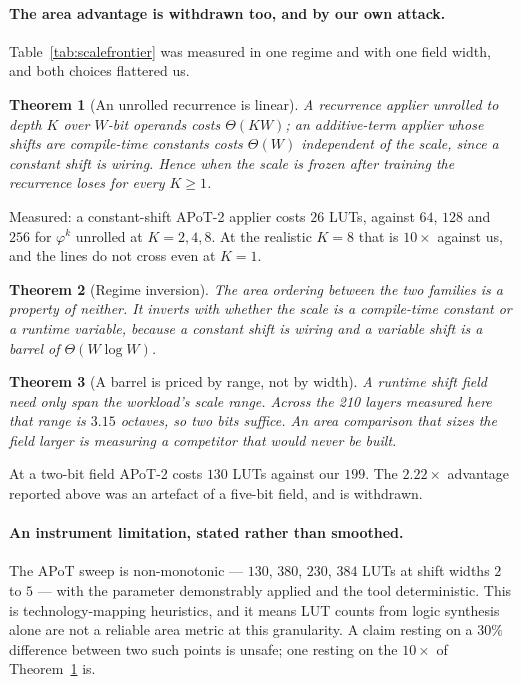 \documentclass[11pt]{article}
\newtheorem{theorem}{Theorem}
\theoremstyle{definition}
\begin{document}
\paragraph{The area advantage is withdrawn too, and by our own attack.}
Table~\ref{tab:scalefrontier} was measured in one regime and with one field
width, and both choices flattered us.

\begin{theorem}[An unrolled recurrence is linear]
\label{thm:unrolled}
A recurrence applier unrolled to depth $K$ over $W$-bit operands costs
$\Theta(KW)$; an additive-term applier whose shifts are compile-time constants
costs $\Theta(W)$ independent of the scale, since a constant shift is wiring.
Hence when the scale is frozen after training the recurrence loses for every
$K \ge 1$.
\end{theorem}

Measured: a constant-shift APoT-2 applier costs $26$ LUTs, against $64$, $128$
and $256$ for $\varphi^{k}$ unrolled at $K=2,4,8$. At the realistic $K=8$ that is
$10\times$ against us, and the lines do not cross even at $K=1$.

\begin{theorem}[Regime inversion]
\label{thm:regime}
The area ordering between the two families is a property of neither. It inverts
with whether the scale is a compile-time constant or a runtime variable, because
a constant shift is wiring and a variable shift is a barrel of
$\Theta(W\log W)$.
\end{theorem}

\begin{theorem}[A barrel is priced by range, not by width]
\label{thm:barrelrange}
A runtime shift field need only span the workload's scale range. Across the 210
layers measured here that range is $3.15$ octaves, so two bits suffice. An area
comparison that sizes the field larger is measuring a competitor that would never
be built.
\end{theorem}

At a two-bit field APoT-2 costs $130$ LUTs against our $199$. The $2.22\times$
advantage reported above was an artefact of a five-bit field, and is withdrawn.

\paragraph{An instrument limitation, stated rather than smoothed.} The APoT sweep
is non-monotonic --- $130$, $380$, $230$, $384$ LUTs at shift widths $2$ to $5$
--- with the parameter demonstrably applied and the tool deterministic. This is
technology-mapping heuristics, and it means LUT counts from logic synthesis alone
are not a reliable area metric at this granularity. A claim resting on a $30\%$
difference between two such points is unsafe; one resting on the $10\times$ of
Theorem~\ref{thm:unrolled} is.
\end{document}
